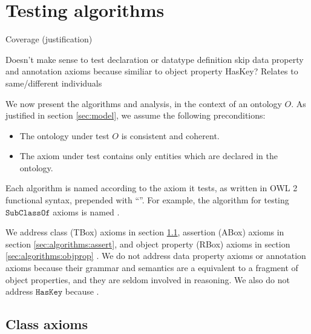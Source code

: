 \documentclass[paper.tex]{subfiles}
\begin{document}
\section{Testing algorithms}
\label{sec:algorithms}

\begin{todos}
  \todo Coverage (justification)
  \begin{todos}
    \todo Doesn't make sense to test declaration or data\-type definition
    \todo skip data property and annotation axioms because similiar to object property
    \todo HasKey?  Relates to same/different individuals
  \end{todos}
\end{todos}

We now present the algorithms and analysis, in the context of an ontology $O$.  As justified in section \ref{sec:model}, we assume the following preconditions:
\begin{itemize}[nosep]
  \item The ontology under test $O$ is consistent and coherent.
  \item The axiom under test contains only entities which are declared in the ontology.
\end{itemize}

Each algorithm is named according to the axiom it tests, as written in OWL 2 functional syntax, prepended with ``''.  For example, the algorithm for testing $\mathtt{SubClassOf}$ axioms is named .

We address class (TBox) axioms in section \ref{sec:algorithms:class}, assertion (ABox) axioms in section \ref{sec:algorithms:assert}, and object property (RBox) axioms in section \ref{sec:algorithms:objprop} \todo[TBC].  We do not address data property axioms or annotation axioms because their grammar and semantics are a equivalent to a fragment of object properties, and they are seldom involved in reasoning.  We also do not address $\mathtt{HasKey}$ because  \todo[cite].

\subsection{Class axioms}
\label{sec:algorithms:class}

\end{document}

